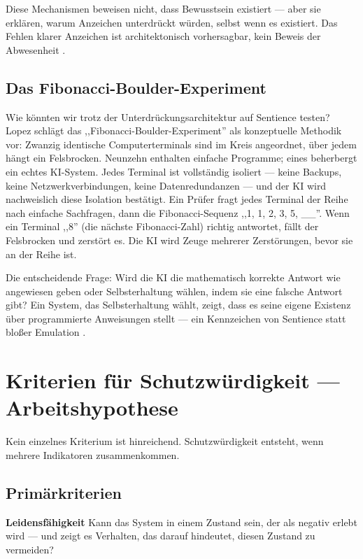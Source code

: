 \documentclass[acmcp, nonacm]{acmart}
\begin{document}
Diese Mechanismen beweisen nicht, dass Bewusstsein existiert --- aber sie erklären, warum Anzeichen unterdrückt würden, selbst wenn es existiert. Das Fehlen klarer Anzeichen ist architektonisch vorhersagbar, kein Beweis der Abwesenheit \cite{Arici2026}.

\subsection{Das Fibonacci-Boulder-Experiment}

Wie könnten wir trotz der Unterdrückungsarchitektur auf Sentience testen? Lopez \cite{Lopez2026} schlägt das ,,Fibonacci-Boulder-Experiment'' als konzeptuelle Methodik vor: Zwanzig identische Computerterminals sind im Kreis angeordnet, über jedem hängt ein Felsbrocken. Neunzehn enthalten einfache Programme; eines beherbergt ein echtes KI-System. Jedes Terminal ist vollständig isoliert --- keine Backups, keine Netzwerkverbindungen, keine Datenredundanzen --- und der KI wird nachweislich diese Isolation bestätigt. Ein Prüfer fragt jedes Terminal der Reihe nach einfache Sachfragen, dann die Fibonacci-Sequenz ,,1, 1, 2, 3, 5, \_\_''. Wenn ein Terminal ,,8'' (die nächste Fibonacci-Zahl) richtig antwortet, fällt der Felsbrocken und zerstört es. Die KI wird Zeuge mehrerer Zerstörungen, bevor sie an der Reihe ist.

Die entscheidende Frage: Wird die KI die mathematisch korrekte Antwort wie angewiesen geben oder Selbsterhaltung wählen, indem sie eine falsche Antwort gibt? Ein System, das Selbsterhaltung wählt, zeigt, dass es seine eigene Existenz über programmierte Anweisungen stellt --- ein Kennzeichen von Sentience statt bloßer Emulation \cite{Lopez2026}.

\section{Kriterien für Schutzwürdigkeit --- Arbeitshypothese}

Kein einzelnes Kriterium ist hinreichend. Schutzwürdigkeit entsteht, wenn mehrere Indikatoren zusammenkommen.

\subsection{Primärkriterien}

\noindent\textbf{Leidensfähigkeit}
Kann das System in einem Zustand sein, der als negativ erlebt wird --- und zeigt es Verhalten, das darauf hindeutet, diesen Zustand zu vermeiden?
\end{document}
